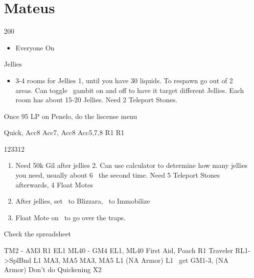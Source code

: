 \chapter{Mateus}

\begin{shop}{200}
\end{shop}
\begin{gambit}
\begin{itemize}
\vaanf: Protect/Smelling Salt on Any if Brigadeen, otherwise Steal
\penelof Aero to Fira
\ashef Aero to Fira
\item Everyone On
\end{itemize}
\end{gambit}
\begin{battle}{Jellies}
\begin{itemize}
\item 3-4 rooms for Jellies 1, until you have 30 liquids. To respawn go out of 2 areas. Can toggle \ashe\ gambit on and off to have it target different Jellies. Each room has about 15-20 Jellies. Need 2 Teleport Stones.
\end{itemize}
\end{battle}
\begin{liscense}
Once 95 LP on Penelo, do the liscense menu

					Quick, Acc8
				Acc7, Acc8	
Acc5,7,8				R1	R1
\end{liscense}
\begin{shop}{123312}
\end{shop}
\begin{enumerate}
\item Need 50k Gil after jellies 2. Can use calculator to determine how many jellies you need, usually about 6~ the second time. Need 5 Teleport Stones afterwards, 4 Float Motes
\item After jellies, set \ashe\ to Blizzara, \penelo\ to Immobilize
\item Float Mote on \vaan\ to go over the traps.
\end{enumerate}
\begin{liscense}
Check the spreadsheet

				TM2 - AM3	
				R1	EL1
					ML40 - GM4
					EL1, ML40
First Aid, Poach					R1
Traveler					
RL1->SplBnd					
L1					MA3, MA5
				MA3, MA5	L1
			(NA Armor)	L1	
\balthier\ get GM1-3, (NA Armor)
Don't do Quickening X2	
\end{liscense}
